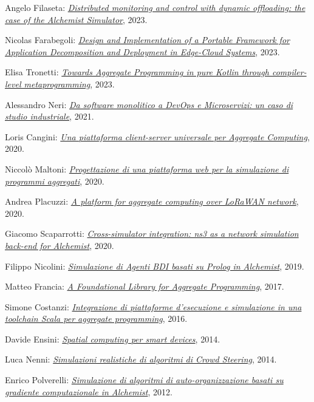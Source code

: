 \begin{innerlist}
    \item Angelo Filaseta: \href{https://amslaurea.unibo.it/28111/}{\textit{Distributed monitoring and control with dynamic offloading: the case of the Alchemist Simulator}}, 2023.
    \item Nicolas Farabegoli: \href{https://amslaurea.unibo.it/28035/}{\textit{Design and Implementation of a Portable Framework for Application Decomposition and Deployment in Edge-Cloud Systems}}, 2023.
    \item Elisa Tronetti: \href{https://amslaurea.unibo.it/28077/}{\textit{Towards Aggregate Programming in pure Kotlin through compiler-level metaprogramming}}, 2023.
    \item Alessandro Neri: \href{http://amslaurea.unibo.it/23043/}{\textit{Da software monolitico a DevOps e Microservizi: un caso di studio industriale}}, 2021.
    \item Loris Cangini: \href{http://amslaurea.unibo.it/20410/}{\textit{Una piattaforma client-server universale per Aggregate Computing}}, 2020.
    \item Niccolò Maltoni: \href{http://amslaurea.unibo.it/20478/}{\textit{Progettazione di una piattaforma web per la simulazione di programmi aggregati}}, 2020.
    \item Andrea Placuzzi: \href{http://amslaurea.unibo.it/20484/}{\textit{A platform for aggregate computing over LoRaWAN network}}, 2020.
    \item Giacomo Scaparrotti: \href{http://amslaurea.unibo.it/20440/}{\textit{Cross-simulator integration: ns3 as a network simulation back-end for Alchemist}}, 2020.
    \item Filippo Nicolini: \href{http://amslaurea.unibo.it/19521/}{\textit{Simulazione di Agenti BDI basati su Prolog in Alchemist}}, 2019.
    \item Matteo Francia: \href{http://amslaurea.unibo.it/13090/}{\textit{A Foundational Library for Aggregate Programming}}, 2017.
    \item Simone Costanzi: \href{http://amslaurea.unibo.it/10519/}{\textit{Integrazione di piattaforme d'esecuzione e simulazione in una toolchain Scala per aggregate programming}}, 2016.
    \item Davide Ensini: \href{http://amslaurea.unibo.it/7990/}{\textit{Spatial computing per smart devices}}, 2014.
    \item Luca Nenni: \href{http://amslaurea.unibo.it/6927/}{\textit{Simulazioni realistiche di algoritmi di Crowd Steering}}, 2014.
    \item Enrico Polverelli: \href{http://amslaurea.unibo.it/5293/}{\textit{Simulazione di algoritmi di auto-organizzazione basati su gradiente computazionale in Alchemist}}, 2012.

\end{innerlist}
